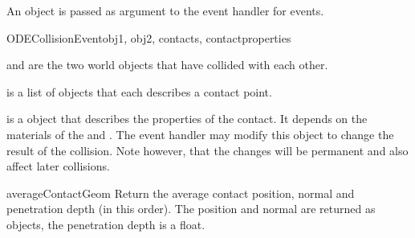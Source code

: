 An  object is passed as argument to the event
handler for  events.

\begin{classdesc}{ODECollisionEvent}{obj1, obj2, contacts, contactproperties}

 and  are the two world objects that have collided with 
each other.

 is a list of  objects that each describes
a contact point.

 is a  object that
describes the properties of the contact. It depends on the materials
of the  and . The event handler may modify
this object to change the result of the collision. Note however, that
the changes will be permanent and also affect later collisions.
\end{classdesc}

\begin{methoddesc}{averageContactGeom}{}
Return the average contact position, normal and penetration depth (in
this order). The position and normal are returned as 
objects, the penetration depth is a float.
\end{methoddesc}
